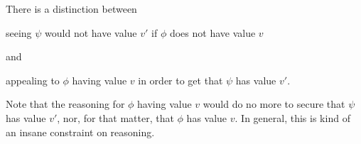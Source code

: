 \begin{note}
  There is a distinction between

  seeing \(\psi\) would not have value \(v'\) if \(\phi\) does not have value \(v\)

  and

  appealing to \(\phi\) having value \(v\) in order to get that \(\psi\) has value \(v'\).


  Note that the reasoning for \(\phi\) having value \(v\) would do no more to secure that \(\psi\) has value \(v'\), nor, for that matter, that \(\phi\) has value \(v\).
  In general, this is kind of an insane constraint on reasoning.
\end{note}





